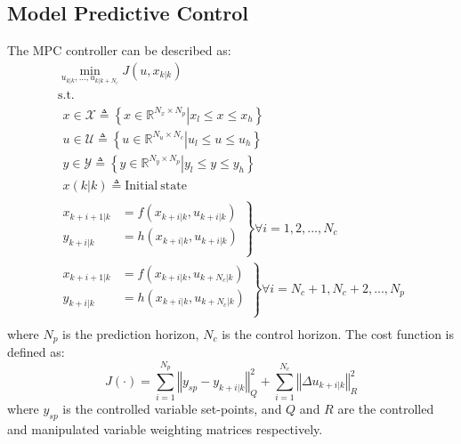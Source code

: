 \documentclass[preprint,authoryear,12pt]{elsarticle}
\begin{document}
\subsection{Model Predictive Control}\label{sec:MPC}
The MPC controller can be described as:
\begin{equation}\label{eq:mpc_obj}
\begin{array}{l}
\underset{u_{k|k},...,u_{k|k+N_c}}{\min} J\left(u,x_{k|k}\right)\\
\mathrm{s.t.}\\
\begin{array}{l}
x\in \mathcal{X} \triangleq \left\lbrace \left.x\in\mathbb{R}^{N_x\times N_p}\right|x_l\leq x\leq x_h \right\rbrace\\
u\in \mathcal{U} \triangleq \left\lbrace \left.u\in\mathbb{R}^{N_u\times N_c}\right|u_l\leq u\leq u_h \right\rbrace\\
y\in \mathcal{Y} \triangleq \left\lbrace \left.y\in\mathbb{R}^{N_y\times N_p}\right|y_l\leq y\leq y_h \right\rbrace\\

x(k|k) \triangleq \mathrm{Initial~state}
\end{array}\\
\left.
\begin{array}{ll}
x_{k+i+1|k} &= f\left(x_{k+i|k},u_{k+i|k}\right) \\
y_{k+i|k} &= h\left(x_{k+i|k},u_{k+i|k}\right)\\
\end{array}\right\rbrace \forall i=1,2,...,N_c\\
\left.
\begin{array}{ll}
x_{k+i+1|k} &= f\left(x_{k+i|k},u_{k+N_c|k}\right) \\
y_{k+i|k} &= h\left(x_{k+i|k},u_{k+N_c|k}\right)\\
\end{array}\right\rbrace \forall i=N_c+1,N_c+2,...,N_p\\
\end{array}
\end{equation}
where $N_p$ is the prediction horizon, $N_c$ is the control horizon. The cost function is defined as:
\begin{equation}
J(\cdot) = \displaystyle\sum_{i=1}^{N_p} \left\Vert y_{sp}-y_{k+i|k} \right\Vert _Q^2  + \displaystyle\sum_{i=1}^{N_c} \left\Vert\Delta u_{k+i|k} \right\Vert_R^2
\end{equation}
where $y_{sp}$ is the controlled variable set-points, and $Q$ and $R$ are the controlled and manipulated variable weighting matrices respectively. 
\end{document}
